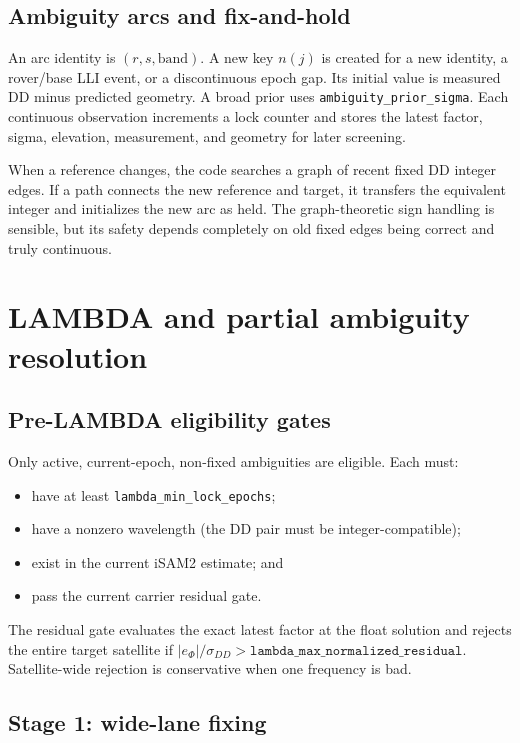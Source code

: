 \documentclass[11pt,a4paper]{article}
\newcommand{\code}[1]{\texttt{#1}}
\begin{document}
\subsection{Ambiguity arcs and fix-and-hold}

An arc identity is $(r,s,\mathrm{band})$.  A new key $n(j)$ is created for a new
identity, a rover/base LLI event, or a discontinuous epoch gap.  Its initial
value is measured DD minus predicted geometry.  A broad prior uses
\code{ambiguity\_prior\_sigma}.  Each continuous observation increments a lock
counter and stores the latest factor, sigma, elevation, measurement, and
geometry for later screening.

When a reference changes, the code searches a graph of recent fixed DD integer
edges.  If a path connects the new reference and target, it transfers the
equivalent integer and initializes the new arc as held.  The graph-theoretic
sign handling is sensible, but its safety depends completely on old fixed edges
being correct and truly continuous.

\section{LAMBDA and partial ambiguity resolution}

\subsection{Pre-LAMBDA eligibility gates}

Only active, current-epoch, non-fixed ambiguities are eligible.  Each must:
\begin{itemize}
  \item have at least \code{lambda\_min\_lock\_epochs};
  \item have a nonzero wavelength (the DD pair must be integer-compatible);
  \item exist in the current iSAM2 estimate; and
  \item pass the current carrier residual gate.
\end{itemize}
The residual gate evaluates the exact latest factor at the float solution and
rejects the entire target satellite if
$|e_{\Phi}|/\sigma_{DD}>\code{lambda\_max\_normalized\_residual}$.
Satellite-wide rejection is conservative when one frequency is bad.

\subsection{Stage 1: wide-lane fixing}
\end{document}
